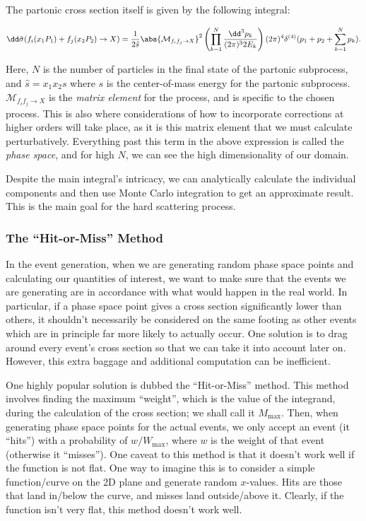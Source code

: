 The partonic cross section itself is given by the following integral:

\begin{equation}
  \dd\hat{\sigma}(f_i(x_1 P_1) + f_j(x_2 P_2) \rightarrow X) = \frac{1}{2\hat{s}} \abs{\mathcal{M}_{f_if_j \rightarrow X}}^2 \left( \prod_{k=1}^{N} \frac{\dd^3 p_k}{(2\pi)^3 2E_k} \right) (2\pi)^4 \delta^{(4)}(p_1 + p_2 + \sum_{k=1}^{N} p_k).
\end{equation}

Here, $N$ is the number of particles in the final state of the partonic subprocess, and $\hat{s} = x_1 x_2 s$ where $s$ is the center-of-mass energy for the partonic subprocess. $\mathcal{M}_{f_if_j \rightarrow X}$ is the \textit{matrix element} for the process, and is specific to the chosen process. This is also where considerations of how to incorporate corrections at higher orders will take place, as it is this matrix element that we must calculate perturbatively. Everything past this term in the above expression is called the \textit{phase space}, and for high $N$, we can see the high dimensionality of our domain.

Despite the main integral's intricacy, we can analytically calculate the individual components and then use Monte Carlo integration to get an approximate result. This is the main goal for the hard scattering process.

\subsubsection{The ``Hit-or-Miss'' Method}

In the event generation, when we are generating random phase space points and calculating our quantities of interest, we want to make sure that the events we are generating are in accordance with what would happen in the real world. In particular, if a phase space point gives a cross section significantly lower than others, it shouldn't necessarily be considered on the same footing as other events which are in principle far more likely to actually occur. One solution is to drag around every event's cross section so that we can take it into account later on. However, this extra baggage and additional computation can be inefficient.

One highly popular solution is dubbed the ``Hit-or-Miss'' method. This method involves finding the maximum ``weight'', which is the value of the integrand, during the calculation of the cross section; we shall call it $M_{\mathrm{max}}$. Then, when generating phase space points for the actual events, we only accept an event (it ``hits'') with a probability of $w/W_{\mathrm{max}}$, where $w$ is the weight of that event (otherwise it ``misses''). One caveat to this method is that it doesn't work well if the function is not flat. One way to imagine this is to consider a simple function/curve on the 2D plane and generate random $x$-values. Hits are those that land in/below the curve, and misses land outside/above it. Clearly, if the function isn't very flat, this method doesn't work well.

